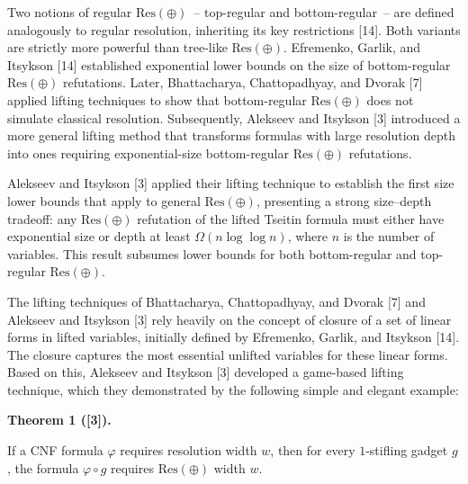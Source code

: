 Two notions of regular $\mathrm{Res}(\oplus)$ – top-regular and bottom-regular – are defined analogously to regular resolution, inheriting its key restrictions [14]. Both variants are strictly more powerful than tree-like $\mathrm{Res}(\oplus)$. Efremenko, Garlik, and Itsykson [14] established exponential lower bounds on the size of bottom-regular $\mathrm{Res}(\oplus)$ refutations. Later, Bhattacharya, Chattopadhyay, and Dvorak [7] applied lifting techniques to show that bottom-regular $\mathrm{Res}(\oplus)$ does not simulate classical resolution. Subsequently, Alekseev and Itsykson [3] introduced a more general lifting method that transforms formulas with large resolution depth into ones requiring exponential-size bottom-regular $\mathrm{Res}(\oplus)$ refutations.\par



Alekseev and Itsykson [3] applied their lifting technique to establish the first size lower bounds that apply to general $\mathrm{Res}(\oplus)$, presenting a strong size–depth tradeoff: any $\mathrm{Res}(\oplus)$ refutation of the lifted Tseitin formula must either have exponential size or depth at least $\Omega(n\log\log n)$, where $n$ is the number of variables. This result subsumes lower bounds for both bottom-regular and top-regular $\mathrm{Res}(\oplus)$.\par



The lifting techniques of Bhattacharya, Chattopadhyay, and Dvorak [7] and Alekseev and Itsykson [3] rely heavily on the concept of closure of a set of linear forms in lifted variables, initially defined by Efremenko, Garlik, and Itsykson [14]. The closure captures the most essential unlifted variables for these linear forms. Based on this, Alekseev and Itsykson [3] developed a game-based lifting technique, which they demonstrated by the following simple and elegant example:\par



\par\medskip\noindent\textbf{
Theorem 1 ([3]).
}\par



If a CNF formula $\varphi$ requires resolution width $w$, then for every $1$-stifling gadget $g$, the formula $\varphi\circ g$ requires $\mathrm{Res}(\oplus)$ width $w$.\par




